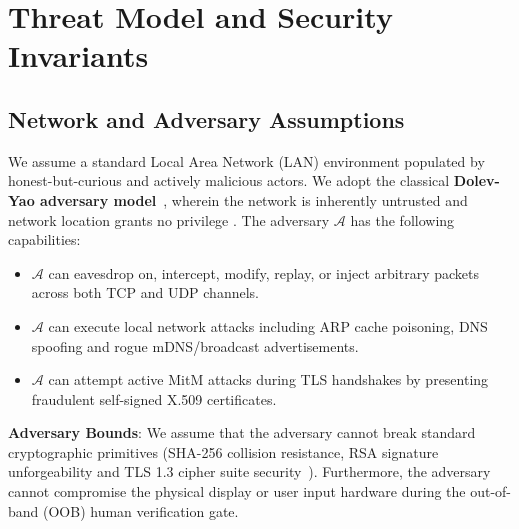 \documentclass[conference,a4paper]{IEEEtran}
\begin{document}
\section{Threat Model and Security Invariants}

\subsection{Network and Adversary Assumptions}
We assume a standard Local Area Network (LAN) environment populated by honest-but-curious and actively malicious actors. We adopt the classical \textbf{Dolev-Yao adversary model}~\cite{dolev1983security}, wherein the network is inherently untrusted and network location grants no privilege \cite{nist80207}. The adversary $\mathcal{A}$ has the following capabilities:
\begin{itemize}
    \item $\mathcal{A}$ can eavesdrop on, intercept, modify, replay, or inject arbitrary packets across both TCP and UDP channels.
    \item $\mathcal{A}$ can execute local network attacks including ARP cache poisoning, DNS spoofing and rogue mDNS/broadcast advertisements.
    \item $\mathcal{A}$ can attempt active MitM attacks during TLS handshakes by presenting fraudulent self-signed X.509 certificates.
\end{itemize}

\textbf{Adversary Bounds}: We assume that the adversary cannot break standard cryptographic primitives (SHA-256 collision resistance, RSA signature unforgeability and TLS 1.3 cipher suite security~\cite{rfc8446}). Furthermore, the adversary cannot compromise the physical display or user input hardware during the out-of-band (OOB) human verification gate.
\end{document}
